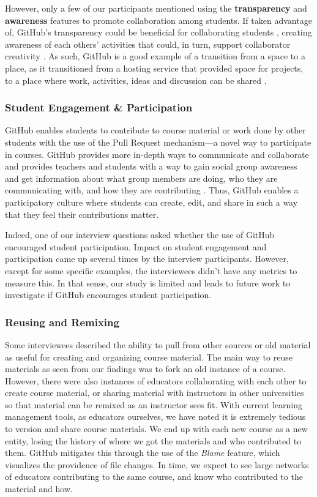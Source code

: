 However, only a few of our participants mentioned using the \textbf{transparency} and \textbf{awareness} features to promote collaboration among students. If taken advantage of, GitHub's transparency could be beneficial for collaborating students \cite{dalsgaard2009transparency}, creating awareness of each others' activities that could, in turn, support collaborator creativity \cite{farooq2007supporting}. As such, GitHub is a good example of a transition from a space to a place, as it transitioned from a hosting service that provided space for projects, to a place where work, activities, ideas and discussion can be shared \cite{dourish1992awareness}.
\\ %
\subsubsection{Student Engagement \& Participation}
GitHub enables students to contribute to course material or work done by other students with the use of the Pull Request mechanism---a novel way to participate in courses. GitHub provides more in-depth ways to communicate and collaborate and provides teachers and students with a way to gain social group awareness and get information about what group members are doing, who they are communicating with, and how they are contributing \cite{janssen2013coordinated}. Thus, GitHub enables a participatory culture \cite{jenkins2009confronting} where students can create, edit, and share in such a way that they feel their contributions matter.

Indeed, one of our interview questions asked whether the use of GitHub encouraged student participation. Impact on student engagement and participation came up several times by the interview participants. However, except for some specific examples, the interviewees didn't have any metrics to measure this. In that sense, our study is limited and leads to future work to investigate if GitHub encourages student participation.

\subsubsection{Reusing and Remixing}
Some interviewees described the ability to pull from other sources or old material as useful for creating and organizing course material. The main way to reuse materials as seen from our findings was to fork an old instance of a course. However, there were also instances of educators collaborating with each other to create course material, or sharing material with instructors in other universities so that material can be remixed as an instructor sees fit. With current learning management tools, as educators ourselves, we have noted it is extremely tedious to version and share course materials. We end up with each new course as a new entity, losing the history of where we got the materials and who contributed to them. GitHub mitigates this through the use of the \textit{Blame} feature, which visualizes the providence of file changes. In time, we expect to see large networks of educators contributing to the same course, and know who contributed to the material and how.

